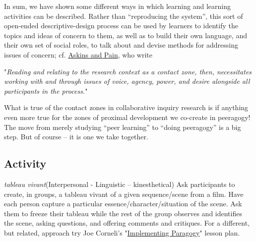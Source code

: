 In sum, we have shown some different ways in which learning and learning
activities can be described. Rather than ``reproducing the system'',
this sort of open-ended descriptive-design process can be used by
learners to identify the topics and ideas of concern to them, as well as
to build their own language, and their own set of social roles, to talk
about and devise methods for addressing issues of concern; cf.
\href{http://scholar.google.com/scholar?cluster=7641713096478524562\&hl=en\&as\_sdt=0,14}{Askins
and Pain}, who write

"\emph{Reading and relating to the research context as a contact zone,
then, necessitates working with and through issues of voice, agency,
power, and desire alongside all participants in the process.}"

What is true of the contact zones in collaborative inquiry research is
if anything even more true for the zones of proximal development we
co-create in peeragogy! The move from merely studying ``peer learning''
to ``doing peeragogy'' is a big step. But of course -- it is one we take
together.

\subsection{Activity}

\emph{tableau vivant}(Interpersonal - Linguistic -- kinesthetical) Ask
participants to create, in groups, a tableau vivant of a given
sequence/scene from a film. Have each person capture a particular
essence/character/situation of the scene. Ask them to freeze their
tableau while the rest of the group observes and identifies the scene,
asking questions, and offering comments and critiques. For a different,
but related, approach try Joe Corneli's
"\href{http://en.wikiversity.org/wiki/User:Arided/ImplementingParagogy}{Implementing
Paragogy}" lesson plan.
